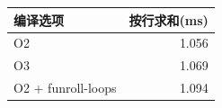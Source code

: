 \begin{longtable}{p{85mm}r}\toprule 编译选项 & 按行求和(ms)\\\midrule\endhead
O2 & 1.056\\
O3 & 1.069\\
O2 + funroll-loops & 1.094\\
\bottomrule\end{longtable}

